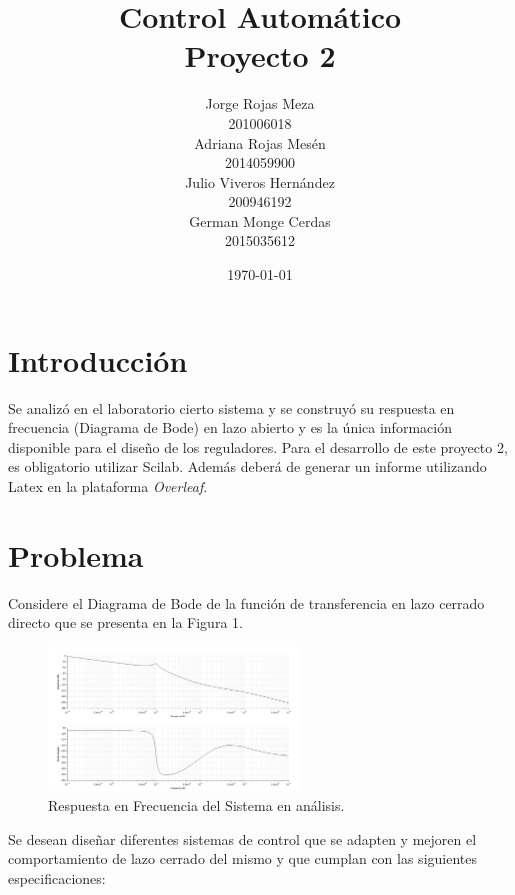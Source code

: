 \documentclass[12pt,letterpaper]{article}
\begin{document}
\title{Control Automático\\Proyecto 2}

\author{Jorge Rojas Meza\\201006018\\Adriana Rojas Mesén\\2014059900\\Julio Viveros Hernández\\200946192\\German Monge Cerdas\\2015035612}
\date{\today}
\maketitle
\section{Introducción}
Se analizó en el laboratorio cierto sistema y se construyó su respuesta en frecuencia (Diagrama de Bode) en lazo abierto y es la única información disponible para el diseño de los reguladores. Para el desarrollo de este proyecto 2, es obligatorio utilizar Scilab. Además deberá de generar un informe utilizando Latex en la plataforma \textit{Overleaf}.

\section{Problema}

Considere el Diagrama de Bode de la función de transferencia en lazo cerrado directo que se presenta en la Figura 1.\\
\begin{figure}
  \centering
    \includegraphics[width=0.6\textwidth]{Figura1.jpg}
  \caption{Respuesta en Frecuencia del Sistema en análisis.}
  \label{fig:ejemplo}
\end{figure}

Se desean diseñar diferentes sistemas de control que se adapten y mejoren el comportamiento de lazo cerrado del mismo y que cumplan con las siguientes especificaciones:
\end{document}
